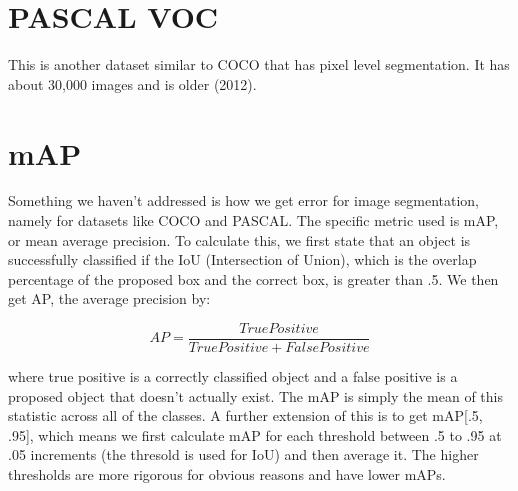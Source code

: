 \documentclass{article}
\begin{document}
\section{PASCAL VOC}
This is another dataset similar to COCO that has pixel level segmentation. It has about 30,000 images and is older (2012).

\section{mAP}
Something we haven't addressed is how we get error for image segmentation, namely for datasets like COCO and PASCAL. The specific metric used is mAP, or mean average precision. To calculate this, we first state that an object is successfully classified if the IoU (Intersection of Union), which is the overlap percentage of the proposed box and the correct box, is greater than .5. We then get AP, the average precision by:

$$ AP = \frac{True Positive}{True Positive + False Positive} $$

where true positive is a correctly classified object and a false positive is a proposed object that doesn't actually exist. The mAP is simply the mean of this statistic across all of the classes. A further extension of this is to get mAP[.5, .95], which means we first calculate mAP for each threshold between .5 to .95 at .05 increments (the thresold is used for IoU) and then average it. The higher thresholds are more rigorous for obvious reasons and have lower mAPs.
\end{document}

